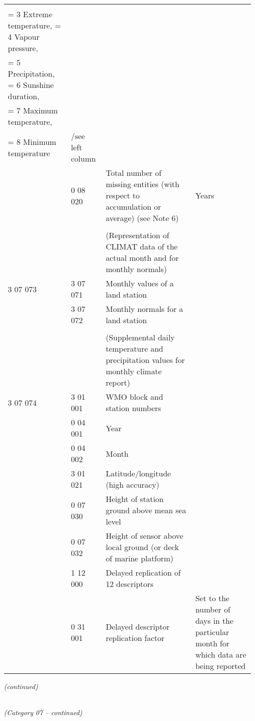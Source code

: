 \begin{longtable}[]{@{}llll@{}}
\begin{minipage}[t]{0.22\columnwidth}
\begin{quote}
= 1 Pressure, = 2 Temperature,\\
= 3 Extreme temperature, = 4 Vapour pressure,\\
= 5 Precipitation, = 6 Sunshine duration,\\
= 7 Maximum temperature,\\
= 8 Minimum temperature
\end{quote}\strut
\end{minipage} & \begin{minipage}[t]{0.22\columnwidth}\raggedright
/see left column\strut
\end{minipage}\tabularnewline
& 0 08 020 & Total number of missing entities (with respect to accumulation or average) (see Note 6) & Years\tabularnewline
& & &\tabularnewline
& & (Representation of CLIMAT data of the actual month and for monthly normals) &\tabularnewline
3 07 073 & 3 07 071 & Monthly values of a land station &\tabularnewline
& 3 07 072 & Monthly normals for a land station &\tabularnewline
& & &\tabularnewline
& & (Supplemental daily temperature and precipitation values for monthly climate report) &\tabularnewline
3 07 074 & 3 01 001 & WMO block and station numbers &\tabularnewline
& 0 04 001 & Year &\tabularnewline
& 0 04 002 & Month &\tabularnewline
& 3 01 021 & Latitude/longitude (high accuracy) &\tabularnewline
& 0 07 030 & Height of station ground above mean sea level &\tabularnewline
& 0 07 032 & Height of sensor above local ground (or deck of marine platform) &\tabularnewline
& 1 12 000 & Delayed replication of 12 descriptors &\tabularnewline
& 0 31 001 & Delayed descriptor replication factor & Set to the number of days in the particular month for which data are being reported\tabularnewline
\bottomrule
\end{longtable}

\emph{(continued)}

\emph{\\
(Category 07 -- continued)}

